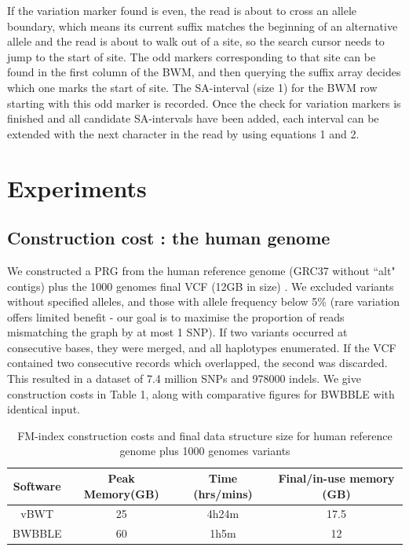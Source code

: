\documentclass[runningheads,a4paper]{llncs}
\begin{document}
If the variation marker found is  even, the read is about to cross an allele boundary, which means its current suffix matches the beginning of an alternative allele and the read is about to walk out of a site, so the search cursor needs to jump to the start of site. The odd markers corresponding to that site can be found in the first column of the BWM, and then querying the suffix array decides which one marks the start of site. The SA-interval (size 1) for the BWM row starting with this odd marker is recorded.
Once the check for variation markers is finished and all candidate SA-intervals have been added, each interval can be extended with the next character in the read by using equations 1 and 2. 





\section{Experiments}
\subsection{Construction cost : the human genome}
We constructed a PRG from the human reference genome (GRC37 without ``alt" contigs) plus the 1000 genomes final VCF (12GB in size) \cite{1000g}. We excluded  variants without  specified alleles, and those with allele frequency below 5\% (rare variation offers limited benefit - our goal is to maximise the proportion of reads mismatching the graph by at most 1 SNP). If two variants occurred at consecutive bases, they were merged, and all haplotypes enumerated. If the VCF contained two consecutive records which overlapped, the second was discarded. This resulted in a dataset of 7.4 million SNPs and 978000 indels. We give construction costs in Table 1, along with comparative figures for BWBBLE with identical input. 
 
\begin{table}
\caption{FM-index construction costs and final data structure size for human reference genome plus 1000 genomes variants}
\centering
\begin{tabular}{c c c c}
\hline
Software  & Peak Memory(GB) & Time (hrs/mins) & Final/in-use memory (GB)\\
\hline
vBWT  & 25  & 4h24m & 17.5 \\
BWBBLE  & 60 &  1h5m  & 12\\ 
\hline
\end{tabular}
\end{table}
\end{document}
